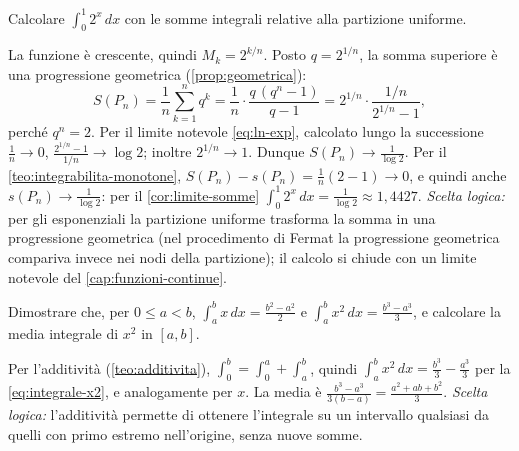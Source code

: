 \begin{esercizio}\label{es:integrale-esponenziale}
Calcolare $\int_{0}^{1}2^{x}\,dx$ con le somme integrali relative alla partizione
uniforme.
\begin{soluzione}
La funzione è crescente, quindi $M_{k}=2^{k/n}$. Posto $q=2^{1/n}$, la somma superiore è
una progressione geometrica (\cref{prop:geometrica}):
\[
  S(P_{n})=\frac1n\sum_{k=1}^{n}q^{k}=\frac1n\cdot\frac{q\,(q^{n}-1)}{q-1}
  =2^{1/n}\cdot\frac{1/n}{2^{1/n}-1},
\]
perché $q^{n}=2$. Per il limite notevole \eqref{eq:ln-exp}, calcolato lungo la
successione $\frac1n\to0$, $\frac{2^{1/n}-1}{1/n}\to\log2$; inoltre $2^{1/n}\to1$. Dunque
$S(P_{n})\to\frac1{\log2}$. Per il \cref{teo:integrabilita-monotone},
$S(P_{n})-s(P_{n})=\frac1n(2-1)\to0$, e quindi anche $s(P_{n})\to\frac1{\log2}$: per il
\cref{cor:limite-somme}
$\int_{0}^{1}2^{x}\,dx=\frac1{\log2}\approx1{,}4427$. \emph{Scelta logica:} per gli
esponenziali la partizione uniforme trasforma la somma in una progressione geometrica
(nel procedimento di Fermat la progressione geometrica compariva invece nei nodi della
partizione); il calcolo si chiude con un limite notevole del
\cref{cap:funzioni-continue}.
\end{soluzione}
\end{esercizio}

\begin{esercizio}\label{es:integrale-a-b}
Dimostrare che, per $0\le a<b$, $\int_{a}^{b}x\,dx=\frac{b^{2}-a^{2}}2$ e
$\int_{a}^{b}x^{2}\,dx=\frac{b^{3}-a^{3}}3$, e calcolare la media integrale di $x^{2}$ in
$[a,b]$.
\begin{soluzione}
Per l'additività (\cref{teo:additivita}), $\int_{0}^{b}=\int_{0}^{a}+\int_{a}^{b}$, quindi
$\int_{a}^{b}x^{2}\,dx=\frac{b^{3}}3-\frac{a^{3}}3$ per la \eqref{eq:integrale-x2}, e
analogamente per $x$. La media è
$\frac{b^{3}-a^{3}}{3(b-a)}=\frac{a^{2}+ab+b^{2}}3$. \emph{Scelta logica:} l'additività
permette di ottenere l'integrale su un intervallo qualsiasi da quelli con primo estremo
nell'origine, senza nuove somme.
\end{soluzione}
\end{esercizio}

